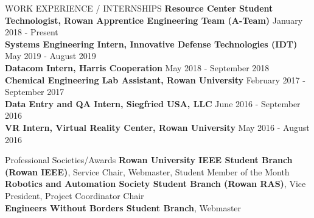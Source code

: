 \documentclass{resume} %
\begin{document}
\begin{rSection}{WORK EXPERIENCE / INTERNSHIPS} \itemsep -3pt
  \textbf{Resource Center Student Technologist, Rowan Apprentice Engineering Team (A-Team)} \hfill January 2018 - Present\\
  \textbf{Systems Engineering Intern, Innovative Defense Technologies (IDT)} \hfill May 2019 - August 2019\\
  \textbf{Datacom Intern, Harris Cooperation} \hfill May 2018 - September 2018\\
  \textbf{Chemical Engineering Lab Assistant, Rowan University} \hfill February 2017 - September 2017\\
  \textbf{Data Entry and QA Intern, Siegfried USA, LLC} \hfill June 2016 - September 2016\\
  \textbf{VR Intern, Virtual Reality Center, Rowan University} \hfill May 2016 - August 2016
\end{rSection}

\begin{rSection}{Professional Societies/Awards} \itemsep -3pt
  {\textbf{Rowan University IEEE Student Branch (Rowan IEEE)}, Service Chair,
    Webmaster, Student Member of the Month}\\
  {\textbf{Robotics and Automation Society Student Branch (Rowan RAS)}, Vice President, Project Coordinator Chair}\\
  {\textbf{Engineers Without Borders Student Branch}, Webmaster}
\end{rSection}
\end{document}
